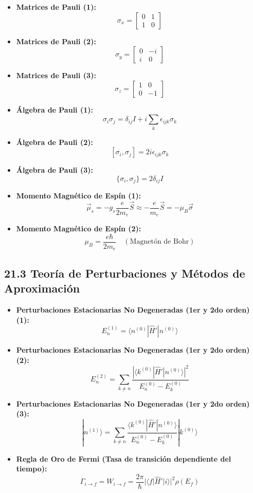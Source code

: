 \documentclass[11pt,a4paper]{article}
\begin{document}
\begin{itemize}
  \item \textbf{Matrices de Pauli (1):}
  \[
    \sigma_x = \begin{bmatrix} 0 & 1 \\ 1 & 0 \end{bmatrix}
  \]
  \item \textbf{Matrices de Pauli (2):}
  \[
    \sigma_y = \begin{bmatrix} 0 & -i \\ i & 0 \end{bmatrix}
  \]
  \item \textbf{Matrices de Pauli (3):}
  \[
    \sigma_z = \begin{bmatrix} 1 & 0 \\ 0 & -1 \end{bmatrix}
  \]
  \item \textbf{Álgebra de Pauli (1):}
  \[
    \sigma_i \sigma_j = \delta_{ij} I + i \sum_k \epsilon_{ijk} \sigma_k
  \]
  \item \textbf{Álgebra de Pauli (2):}
  \[
    [\sigma_i, \sigma_j] = 2i \epsilon_{ijk} \sigma_k
  \]
  \item \textbf{Álgebra de Pauli (3):}
  \[
    \{\sigma_i, \sigma_j\} = 2\delta_{ij} I
  \]
  \item \textbf{Momento Magnético de Espín (1):}
  \[
    \vec{\mu}_s = -g_s \frac{e}{2m_e}\vec{S} \approx -\frac{e}{m_e}\vec{S} = -\mu_B \vec{\sigma}
  \]
  \item \textbf{Momento Magnético de Espín (2):}
  \[
    \mu_B = \frac{e\hbar}{2m_e} \quad (\text{Magnetón de Bohr})
  \]
\end{itemize}

\subsection*{21.3 Teoría de Perturbaciones y Métodos de Aproximación}

\begin{itemize}
  \item \textbf{Perturbaciones Estacionarias No Degeneradas (1er y 2do orden) (1):}
  \[
    E_n^{(1)} = \langle n^{(0)} | \hat{H}' | n^{(0)} \rangle
  \]
  \item \textbf{Perturbaciones Estacionarias No Degeneradas (1er y 2do orden) (2):}
  \[
    E_n^{(2)} = \sum_{k \neq n} \frac{|\langle k^{(0)} | \hat{H}' | n^{(0)} \rangle|^2}{E_n^{(0)} - E_k^{(0)}}
  \]
  \item \textbf{Perturbaciones Estacionarias No Degeneradas (1er y 2do orden) (3):}
  \[
    |n^{(1)}\rangle = \sum_{k \neq n} \frac{\langle k^{(0)} | \hat{H}' | n^{(0)} \rangle}{E_n^{(0)} - E_k^{(0)}} |k^{(0)}\rangle
  \]
  \item \textbf{Regla de Oro de Fermi (Tasa de transición dependiente del tiempo):}
  \[
    \Gamma_{i \to f} = W_{i \to f} = \frac{2\pi}{\hbar} |\langle f | \hat{H}' | i \rangle|^2 \rho(E_f)
  \]
\end{itemize}
\end{document}
